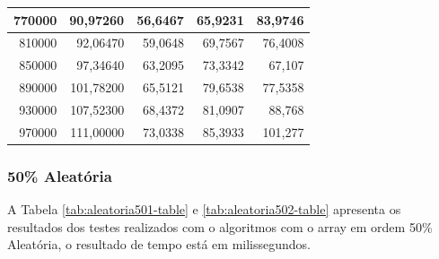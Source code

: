 \documentclass[a4paper, 12pt]{article}
\begin{document}
\begin{longtable}[c]{@{}rrrrr@{}}
	\multicolumn{1}{|r|}{770000}                  & \multicolumn{1}{r|}{90,97260}      & \multicolumn{1}{r|}{56,6467}       & \multicolumn{1}{r|}{65,9231}       & \multicolumn{1}{r|}{83,9746}       \\* \midrule
	\multicolumn{1}{|r|}{810000}                  & \multicolumn{1}{r|}{92,06470}      & \multicolumn{1}{r|}{59,0648}       & \multicolumn{1}{r|}{69,7567}       & \multicolumn{1}{r|}{76,4008}       \\* \midrule
	\multicolumn{1}{|r|}{850000}                  & \multicolumn{1}{r|}{97,34640}      & \multicolumn{1}{r|}{63,2095}       & \multicolumn{1}{r|}{73,3342}       & \multicolumn{1}{r|}{67,107}        \\* \midrule
	\multicolumn{1}{|r|}{890000}                  & \multicolumn{1}{r|}{101,78200}     & \multicolumn{1}{r|}{65,5121}       & \multicolumn{1}{r|}{79,6538}       & \multicolumn{1}{r|}{77,5358}       \\* \midrule
	\multicolumn{1}{|r|}{930000}                  & \multicolumn{1}{r|}{107,52300}     & \multicolumn{1}{r|}{68,4372}       & \multicolumn{1}{r|}{81,0907}       & \multicolumn{1}{r|}{88,768}        \\* \midrule
	\multicolumn{1}{|r|}{970000}                  & \multicolumn{1}{r|}{111,00000}     & \multicolumn{1}{r|}{73,0338}       & \multicolumn{1}{r|}{85,3933}       & \multicolumn{1}{r|}{101,277}       \\* \bottomrule
\end{longtable}
\subsubsection{50\% Aleatória}
A Tabela \ref{tab:aleatoria501-table} e \ref{tab:aleatoria502-table}  apresenta os resultados dos testes realizados com o algoritmos com o array em ordem 50\% Aleatória, o resultado de tempo está em milissegundos.
\end{document}
